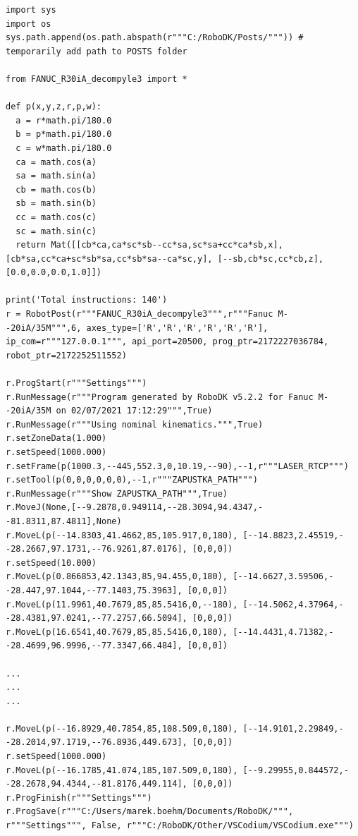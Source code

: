 \label{code:preprocessed_python}
\begin{verbatim}
import sys
import os
sys.path.append(os.path.abspath(r"""C:/RoboDK/Posts/""")) # temporarily add path to POSTS folder

from FANUC_R30iA_decompyle3 import *

def p(x,y,z,r,p,w):
  a = r*math.pi/180.0
  b = p*math.pi/180.0
  c = w*math.pi/180.0
  ca = math.cos(a)
  sa = math.sin(a)
  cb = math.cos(b)
  sb = math.sin(b)
  cc = math.cos(c)
  sc = math.sin(c)
  return Mat([[cb*ca,ca*sc*sb--cc*sa,sc*sa+cc*ca*sb,x], [cb*sa,cc*ca+sc*sb*sa,cc*sb*sa--ca*sc,y], [--sb,cb*sc,cc*cb,z], [0.0,0.0,0.0,1.0]])

print('Total instructions: 140')
r = RobotPost(r"""FANUC_R30iA_decompyle3""",r"""Fanuc M--20iA/35M""",6, axes_type=['R','R','R','R','R','R'], ip_com=r"""127.0.0.1""", api_port=20500, prog_ptr=2172227036784, robot_ptr=2172252511552)

r.ProgStart(r"""Settings""")
r.RunMessage(r"""Program generated by RoboDK v5.2.2 for Fanuc M--20iA/35M on 02/07/2021 17:12:29""",True)
r.RunMessage(r"""Using nominal kinematics.""",True)
r.setZoneData(1.000)
r.setSpeed(1000.000)
r.setFrame(p(1000.3,--445,552.3,0,10.19,--90),--1,r"""LASER_RTCP""")
r.setTool(p(0,0,0,0,0,0),--1,r"""ZAPUSTKA_PATH""")
r.RunMessage(r"""Show ZAPUSTKA_PATH""",True)
r.MoveJ(None,[--9.2878,0.949114,--28.3094,94.4347,--81.8311,87.4811],None)
r.MoveL(p(--14.8303,41.4662,85,105.917,0,180), [--14.8823,2.45519,--28.2667,97.1731,--76.9261,87.0176], [0,0,0])
r.setSpeed(10.000)
r.MoveL(p(0.866853,42.1343,85,94.455,0,180), [--14.6627,3.59506,--28.447,97.1044,--77.1403,75.3963], [0,0,0])
r.MoveL(p(11.9961,40.7679,85,85.5416,0,--180), [--14.5062,4.37964,--28.4381,97.0241,--77.2757,66.5094], [0,0,0])
r.MoveL(p(16.6541,40.7679,85,85.5416,0,180), [--14.4431,4.71382,--28.4699,96.9996,--77.3347,66.484], [0,0,0])

...
...
...

r.MoveL(p(--16.8929,40.7854,85,108.509,0,180), [--14.9101,2.29849,--28.2014,97.1719,--76.8936,449.673], [0,0,0])
r.setSpeed(1000.000)
r.MoveL(p(--16.1785,41.074,185,107.509,0,180), [--9.29955,0.844572,--28.2678,94.4344,--81.8176,449.114], [0,0,0])
r.ProgFinish(r"""Settings""")
r.ProgSave(r"""C:/Users/marek.boehm/Documents/RoboDK/""", r"""Settings""", False, r"""C:/RoboDK/Other/VSCodium/VSCodium.exe""")

\end{verbatim}


